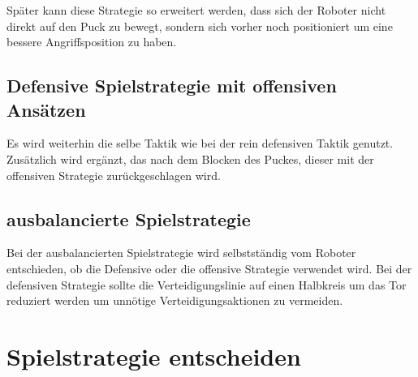 Später kann diese Strategie so erweitert werden, dass sich der Roboter nicht direkt auf den Puck zu bewegt, sondern sich vorher noch positioniert um eine bessere Angriffsposition zu haben.
\subsection{Defensive Spielstrategie mit offensiven Ansätzen}
Es wird weiterhin die selbe Taktik wie bei der rein defensiven Taktik genutzt. Zusätzlich wird ergänzt, das nach dem Blocken des Puckes, dieser mit der offensiven Strategie zurückgeschlagen wird.

\subsection{ausbalancierte Spielstrategie}
Bei der ausbalancierten Spielstrategie wird selbstständig vom Roboter entschieden, ob die Defensive oder die offensive Strategie verwendet wird. Bei der defensiven Strategie sollte die Verteidigungslinie auf einen Halbkreis um das Tor reduziert werden um unnötige Verteidigungsaktionen zu vermeiden.



\section{Spielstrategie entscheiden}

